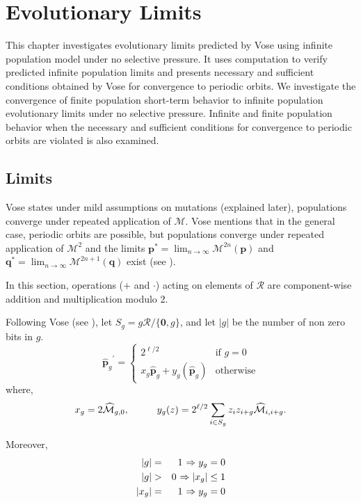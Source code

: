 \chapter{Evolutionary Limits} \label{ch:evolutionary limits}
This chapter investigates evolutionary limits predicted by Vose using infinite population model under no selective pressure. 
It uses computation to verify predicted infinite population limits and presents necessary and sufficient conditions obtained by Vose for 
convergence to periodic orbits. We investigate the convergence of finite population short-term behavior 
to infinite population evolutionary limits under no selective pressure. Infinite and finite population behavior when 
the necessary and sufficient conditions for convergence to periodic orbits are violated is also examined.

\section{Limits}
\label{Limits}
Vose states under mild assumptions on mutations (explained later), populations converge under repeated application 
of $\mathcal{M}$. Vose mentions that in the general case, periodic orbits are possible, but populations converge under 
repeated application of $\mathcal{M}^2$ and the limits ${\bm p}^\ast = \lim_{n \rightarrow \infty} \mathcal{M}^{2n}({\bm p})$ 
and ${\bm q}^\ast = \lim_{n \rightarrow \infty} \mathcal{M}^{2n+1}({\bm q})$ exist (see \cite{Vose1999}).

In this section, operations ($+$ and $\cdot$) acting on elements of $\mathcal{R}$ are component-wise addition and multiplication modulo 2. 

Following Vose (see \cite{Vose1999}), let $S_g = g \mathcal{R} / \{\textbf{0}, g\}$, and let $|g|$ be the number of non zero bits in $g$.
\[
{{\widehat{{\bm p}}}_g}^{\prime}  = \begin{cases}
    2^{\ell /2}  & \text{if $g = 0$}\\
    x_g \widehat{{\bm p}}_g + y_g(\widehat{{\bm p}}_g) & \text{otherwise}
  \end{cases}
\]
where,
\[
x_g = 2\widehat{\mathcal{M}}_{g,0},  \hspace*{1cm} y_g(z) = 2^{\ell /2} \sum_{i \in S_g} z_i z_{i+g} \widehat{\mathcal{M}}_{i,i+g}.
\]

Moreover, 
\begin{eqnarray*}
|g| & = & 1 \hspace{0.01in} \Rightarrow y_g = 0 \\
|g| & > & 0 \hspace{0.01in} \Rightarrow |x_g| \leq 1 \\
|x_g| & = & 1 \hspace{0.01in} \Rightarrow y_g = 0
\end{eqnarray*}

